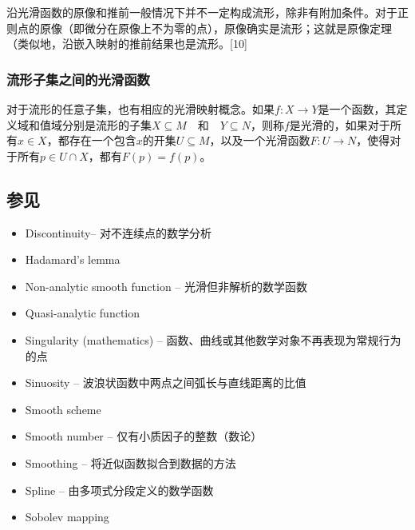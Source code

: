 沿光滑函数的原像和推前一般情况下并不一定构成流形，除非有附加条件。对于正则点的原像（即微分在原像上不为零的点），原像确实是流形；这就是原像定理（类似地，沿嵌入映射的推前结果也是流形。[10]
\subsubsection{流形子集之间的光滑函数}
对于流形的任意子集，也有相应的光滑映射概念。如果$f: X \to Y$是一个函数，其定义域和值域分别是流形的子集$X \subseteq M\quad \text{和} \quad Y \subseteq N$，则称$f$是光滑的，如果对于所有$x \in X$，都存在一个包含$x$的开集$U \subseteq M$，以及一个光滑函数$F: U \to N$，使得对于所有$p \in U \cap X$，都有$F(p) = f(p)$。
\subsection{参见}
\begin{itemize}
\item Discontinuity– 对不连续点的数学分析
\item Hadamard's lemma
\item Non-analytic smooth function – 光滑但非解析的数学函数
\item Quasi-analytic function
\item Singularity (mathematics) – 函数、曲线或其他数学对象不再表现为常规行为的点
\item Sinuosity – 波浪状函数中两点之间弧长与直线距离的比值
\item Smooth scheme
\item Smooth number – 仅有小质因子的整数（数论）
\item Smoothing – 将近似函数拟合到数据的方法
\item Spline – 由多项式分段定义的数学函数
\item Sobolev mapping
\end{itemize}